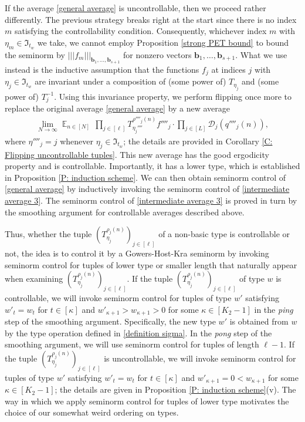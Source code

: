 \documentclass[11pt]{amsart}
\theoremstyle{definition}
\newcommand{\CD}{{\mathcal D}}
\newcommand{\FI}{{\mathfrak I}}
\renewcommand{\b}{{\textbf{b}}}
\newcommand{\nnorm}[1]{\lvert\!|\!| #1|\!|\!\rvert}
\newcommand{\inv}{^{-1}}
\DeclareMathOperator*{\E}{\mathbb{E}}
\newcommand{\brac}[1]{\mathopen{}\left( #1 \mathclose{}\right)}
\begin{document}
If the average \eqref{general average} is uncontrollable, then we proceed rather differently. The previous strategy breaks right at the start since there is no index $m$ satisfying the controllability condition. Consequently, whichever index $m$ with $\eta_m\in\FI_{t_w}$ we take, we cannot employ Proposition \ref{strong PET bound} to bound the seminorm by $\nnorm{f_m}_{\b_1, \ldots, \b_{s+1}}$ for nonzero vectors $\b_1, \ldots, \b_{s+1}$. What we use instead is the inductive assumption that the functions $f_j$ at indices $j$ with $\eta_j\in\FI_{t_w}$ are invariant under a composition of (some power of) $T_{\eta_j}$ and (some power of) $T_j\inv$. Using this invariance property, we perform flipping once more to replace the original average \eqref{general average} by a new average
\begin{align}\label{intermediate average 3}
    \lim_{N\to\infty}\E_{n\in [N]} \,\prod_{j\in[\ell]}T_{{\eta_j''''}}^{\rho''''_j(n)}f''''_j \cdot \prod_{j\in[L]}\CD_{j}(q''''_j(n)),
\end{align}
where $\eta''''_j = j$ whenever $\eta_j\in \FI_{t_w}$; the details are provided in Corollary \ref{C: Flipping uncontrollable tuples}. This new  average has the good ergodicity property and is controllable. Importantly, it has a lower type, which is established in Proposition \ref{P: induction scheme}. We can then obtain seminorm control of \eqref{general average} by inductively invoking the seminorm control of \eqref{intermediate average 3}. The seminorm control of \eqref{intermediate average 3} is proved in turn by the smoothing argument for controllable averages described above.

Thus, whether the tuple $\brac{T_{\eta_j}^{\rho_j(n)}}_{j\in[\ell]}$ of a non-basic type is controllable or not, the idea is to control it by a Gowers-Host-Kra seminorm by invoking seminorm control for tuples of lower type or smaller length that naturally appear when examining $\brac{T_{\eta_j}^{\rho_j(n)}}_{j\in[\ell]}$. If the tuple $\brac{T_{\eta_j}^{\rho_j(n)}}_{j\in[\ell]}$ of type $w$ is controllable, we will invoke seminorm control for tuples of type $w'$ satisfying $w'_t = w_t$ for $t\in[\kappa]$ and $w'_{\kappa+1}>w_{\kappa+1}>0$ for some $\kappa\in[K_2-1]$ in the \textit{ping} step of the smoothing argument. Specifically, the new type $w'$ is obtained from $w$ by the type operation defined in \eqref{definition sigma}. In the \textit{pong} step of the smoothing argument, we will use seminorm control for tuples of length $\ell-1$. If the tuple $\brac{T_{\eta_j}^{\rho_j(n)}}_{j\in[\ell]}$ is uncontrollable, we will invoke seminorm control for tuples of type $w'$ satisfying $w'_t = w_t$ for $t\in[\kappa]$ and $w'_{\kappa+1}=0<w_{\kappa+1}$ for some $\kappa\in [K_2-1]$; the details are given in Proposition \ref{P: induction scheme}(v). The way in which we apply seminorm control for tuples of lower type motivates the choice of our somewhat weird ordering on types.
\end{document}
